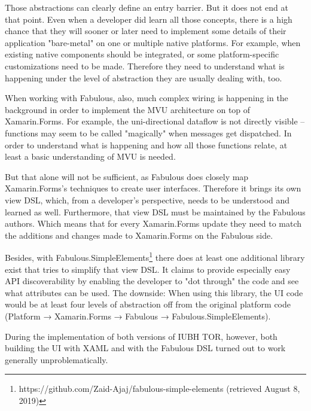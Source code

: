 Those abstractions can clearly define an entry barrier. But it does not end at that point. Even when a developer did learn all those concepts, there is a high chance that they will sooner or later need to implement some details of their application "bare-metal" on one or multiple native platforms. For example, when existing native components should be integrated, or some platform-specific customizations need to be made. Therefore they need to understand what is happening under the level of abstraction they are usually dealing with, too.

When working with Fabulous, also, much complex wiring is happening in the background in order to implement the MVU architecture on top of Xamarin.Forms. For example, the uni-directional dataflow is not directly visible – functions may seem to be called "magically" when messages get dispatched. In order to understand what is happening and how all those functions relate, at least a basic understanding of MVU is needed.

But that alone will not be sufficient, as Fabulous does closely map Xamarin.Forms's techniques to create user interfaces. Therefore it brings its own view DSL, which, from a developer's perspective, needs to be understood and learned as well. Furthermore, that view DSL must be maintained by the Fabulous authors. Which means that for every Xamarin.Forms update they need to match the additions and changes made to Xamarin.Forms on the Fabulous side.

Besides, with Fabulous.SimpleElements\footnote{https://github.com/Zaid-Ajaj/fabulous-simple-elements (retrieved August 8, 2019)} there does at least one additional library exist that tries to simplify that view DSL. It claims to provide especially easy API discoverability by enabling the developer to "dot through" the code and see what attributes can be used. The downside: When using this library, the UI code would be at least four levels of abstraction off from the original platform code (Platform → Xamarin.Forms → Fabulous → Fabulous.SimpleElements).

During the implementation of both versions of IUBH TOR, however, both building the UI with XAML and with the Fabulous DSL turned out to work generally unproblematically.
